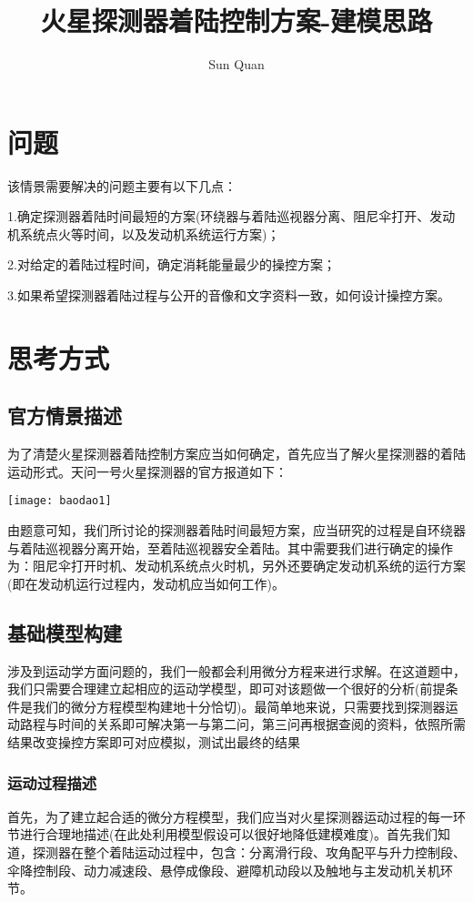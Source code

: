 \documentclass[]{article}
\title{火星探测器着陆控制方案-建模思路}
\author{Sun Quan}
\begin{document}
\maketitle

\section{问题}
	该情景需要解决的问题主要有以下几点：
	
	1.确定探测器着陆时间最短的方案(环绕器与着陆巡视器分离、阻尼伞打开、发动机系统点火等时间，以及发动机系统运行方案)；
	
	2.对给定的着陆过程时间，确定消耗能量最少的操控方案；
	
	3.如果希望探测器着陆过程与公开的音像和文字资料一致，如何设计操控方案。
\section{思考方式}
	\subsection{官方情景描述}
	为了清楚火星探测器着陆控制方案应当如何确定，首先应当了解火星探测器的着陆运动形式。天问一号火星探测器的官方报道如下：
	
	\begin{mdframed}
		\begin{center}
			\texttt{[image: baodao1]}
		\end{center}		
	\end{mdframed}

	由题意可知，我们所讨论的探测器着陆时间最短方案，应当研究的过程是自环绕器与着陆巡视器分离开始，至着陆巡视器安全着陆。其中需要我们进行确定的操作为：阻尼伞打开时机、发动机系统点火时机，另外还要确定发动机系统的运行方案(即在发动机运行过程内，发动机应当如何工作)。
	\subsection{基础模型构建}
	涉及到运动学方面问题的，我们一般都会利用微分方程来进行求解。在这道题中，我们只需要合理建立起相应的运动学模型，即可对该题做一个很好的分析(前提条件是我们的微分方程模型构建地十分恰切)。最简单地来说，只需要找到探测器运动路程与时间的关系即可解决第一与第二问，第三问再根据查阅的资料，依照所需结果改变操控方案即可对应模拟，测试出最终的结果
	\subsubsection{运动过程描述}
	首先，为了建立起合适的微分方程模型，我们应当对火星探测器运动过程的每一环节进行合理地描述(在此处利用模型假设可以很好地降低建模难度)。首先我们知道，探测器在整个着陆运动过程中，包含：分离滑行段、攻角配平与升力控制段、伞降控制段、动力减速段、悬停成像段、避障机动段以及触地与主发动机关机环节。
	
\end{document}
